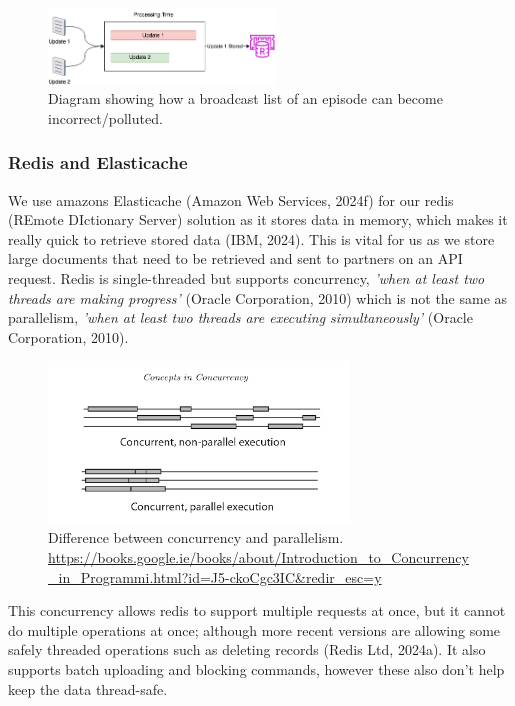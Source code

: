   \begin{figure}[H]
    \centering
    \includegraphics[width=6cm]{assets/raceCondition.drawio.png}
    \caption{Diagram showing how a broadcast list of an episode can become incorrect/polluted.}
    \label{fig:raceCondition}
  \end{figure}

  \subsubsection{Redis and Elasticache}
  We use amazons Elasticache (Amazon Web Services, 2024f) for our redis (REmote DIctionary Server) solution as it stores data in memory, which makes it 
  really quick to retrieve stored data (IBM, 2024). This is vital for us as we store large documents that need to be retrieved and sent to partners on 
  an API request. Redis is single-threaded but supports concurrency, \textit{'when at least two threads are making progress'} (Oracle Corporation, 2010) 
  which is not the same as parallelism, \textit{'when at least two threads are executing simultaneously'} (Oracle Corporation, 2010).

  \begin{figure}[H]
    \centering
    \includegraphics[width=8cm]{assets/concurrecnyVsParallelism.jpg}
    \caption{Difference between concurrency and parallelism. \url{https://books.google.ie/books/about/Introduction_to_Concurrency_in_Programmi.html?id=J5-ckoCgc3IC&redir_esc=y}}
    \label{fig:concurrecnyVsParallelism}
  \end{figure}

  This concurrency allows redis to support multiple requests at once, but it cannot do multiple operations at once; although more recent versions are allowing
  some safely threaded operations such as deleting records (Redis Ltd, 2024a). It also supports batch uploading and blocking commands, however these also 
  don't help keep the data thread-safe.

